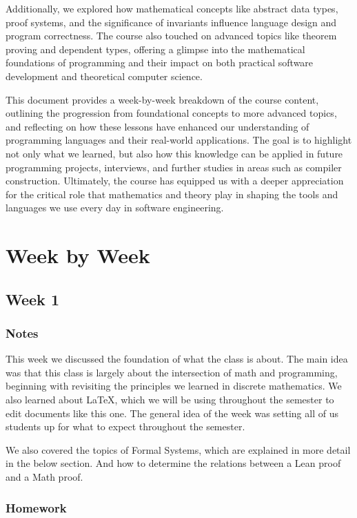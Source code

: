 \documentclass{article}
\theoremstyle{theorem}
\theoremstyle{definition}
\theoremstyle{remark}
\begin{document}
Additionally, we explored how mathematical concepts like abstract data types, proof systems, and the significance of invariants influence 
language design and program correctness. The course also touched on advanced topics like theorem proving and dependent types, offering a 
glimpse into the mathematical foundations of programming and their impact on both practical software development and theoretical computer science.

This document provides a week-by-week breakdown of the course content, outlining the progression from foundational concepts to more advanced 
topics, and reflecting on how these lessons have enhanced our understanding of programming languages and their real-world applications. 
The goal is to highlight not only what we learned, but also how this knowledge can be applied in future programming projects, interviews, 
and further studies in areas such as compiler construction. Ultimately, the course has equipped us with a deeper appreciation for the critical 
role that mathematics and theory play in shaping the tools and languages we use every day in software engineering.
\section{Week by Week}\label{homework}

\subsection{Week 1}
\subsubsection*{Notes}
This week we discussed the foundation of what the class is about.
The main idea was that this class is largely about the intersection
of math and programming, beginning with revisiting the principles we learned
in discrete mathematics. We also learned about LaTeX, which we will be using throughout 
the semester to edit documents like this one. The general idea of the week was setting all of us 
students up for what to expect throughout the semester.

We also covered the topics of Formal Systems, which are explained in more detail in the below
section. And how to determine the relations between a Lean proof and a Math proof.
\subsubsection*{Homework}
\end{document}
